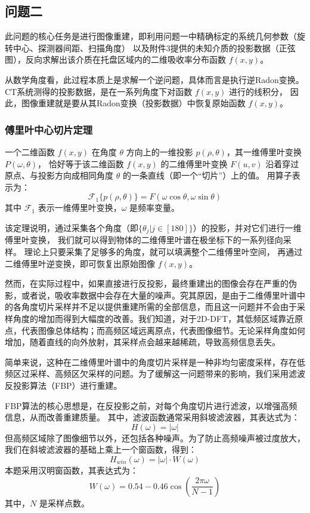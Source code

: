 \subsection{问题二}

此问题的核心任务是进行图像重建，即利用问题一中精确标定的系统几何参数（旋转中心、探测器间距、扫描角度）
以及附件3提供的未知介质的投影数据（正弦图），反向求解出该介质在托盘区域内的二维吸收率分布函数 $f(x,y)$。
\par
从数学角度看，此过程本质上是求解一个逆问题，具体而言是执行逆Radon变换。
CT系统测得的投影数据，是在一系列角度下对函数 $f(x,y)$ 进行的线积分，
因此，图像重建就是要从其Radon变换（投影数据）中恢复原始函数 $f(x,y)$。

\subsubsection{傅里叶中心切片定理}
一个二维函数 $f(x,y)$ 在角度 $\theta$ 方向上的一维投影 $p(\rho,\theta)$，其一维傅里叶变换$P(\omega,\theta)$，
恰好等于该二维函数 $f(x,y)$ 的二维傅里叶变换 $F(u,v)$ 沿着穿过原点、与投影方向成相同角度 $\theta$ 的一条直线（即一个“切片”）上的值。
用算子表示为：
$$\mathcal{F}_1\{p(\rho,\theta)\}=F(\omega\cos\theta,\omega\sin\theta)$$
其中 $\mathcal{F}_1$ 表示一维傅里叶变换，$\omega$ 是频率变量。\par

该定理说明，通过采集各个角度（即$\{\theta_j|j\in [180] \}$）的投影，并对它们进行一维傅里叶变换，
我们就可以得到物体的二维傅里叶谱在极坐标下的一系列径向采样。
理论上只要采集了足够多的角度，就可以填满整个二维傅里叶空间，
再通过二维傅里叶逆变换，即可恢复出原始图像 $f(x,y)$。\par

然而，在实际过程中，如果直接进行反投影，最终重建出的图像会存在严重的伪影，或者说，吸收率数据中会存在大量的噪声。究其原因，是由于二维傅里叶谱中的各角度切片采样并不足以提供重建所需的全部信息，而且这一问题并不会由于采样角度的增加而得到大幅度的改善。我们知道，对于2D-DFT，其低频区域靠近原点，代表图像总体结构；而高频区域远离原点，代表图像细节。无论采样角度如何增加，随着直线的向外放射，其采样点会越来越稀疏，导致高频信息丢失。\par
简单来说，这种在二维傅里叶谱中的角度切片采样是一种非均匀密度采样，存在低频区过采样、高频区欠采样的问题。为了缓解这一问题带来的影响，我们采用滤波反投影算法（FBP）进行重建。\par
FBP算法的核心思想是，在反投影之前，对每个角度切片进行滤波，以增强高频信息，从而改善重建质量。
其中，滤波函数通常采用斜坡滤波器，其表达式为：
$$H(\omega)=|\omega|$$
但高频区域除了图像细节以外，还包括各种噪声。为了防止高频噪声被过度放大，我们在斜坡滤波器的基础上乘上一个窗函数，得到：
$$H_{win}(\omega)=|\omega|\cdot W(\omega)$$
本题采用汉明窗函数，其表达式为：
$$W(\omega) = 0.54 - 0.46 \cos(\frac{2\pi \omega}{N-1})$$
其中，$N$ 是采样点数。\par

